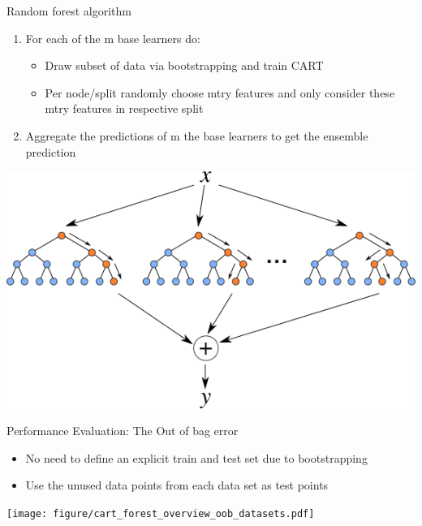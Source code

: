 \begin{vbframe}{Random forest algorithm }
\begin{enumerate}
  \item For each of the m base learners do:
  \begin{itemize}
    \item Draw subset of data via bootstrapping and train CART 
    \item Per node/split randomly choose mtry features and only consider these mtry features in respective split
  \end{itemize}
  \item Aggregate the predictions of m the base learners to get the ensemble prediction
\end{enumerate}
\begin{center}
\includegraphics[height=0.4\textheight, keepaspectratio]{figure_man/forest.png}
\end{center}
\end{vbframe}

\begin{vbframe}{Performance Evaluation: The Out of bag error}
\begin{itemize}
  \item No need to define an explicit train and test set due to bootstrapping 
  \item Use the unused data points from each data set as test points   
\end{itemize}
\begin{center}
\texttt{[image: figure/cart\_forest\_overview\_oob\_datasets.pdf]}
\end{center}
\end{vbframe}


